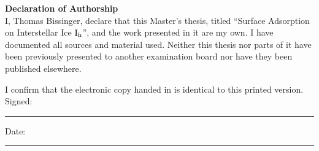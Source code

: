 \begin{center}
\begin{minipage}{.8\textwidth}
{\Huge\textbf{Declaration of Authorship}\\[20pt]}
\Large\noindent I, Thomas Bissinger, declare that this Master's thesis, titled
``Surface Adsorption on Interstellar Ice $\text I_\text h$'', and the
work presented in it are my own. I have documented all sources and material
used. Neither this thesis nor parts of it have been previously presented to
another examination board nor have they been published elsewhere.

I confirm that the electronic copy handed in is identical to this printed
version.\\[10pt]
 
\noindent Signed:\\
\rule[0.5em]{25em}{0.5pt} %
 
\noindent Date:\\
\rule[0.5em]{25em}{0.5pt} %
\end{minipage}
\end{center}
\cleardoublepage

